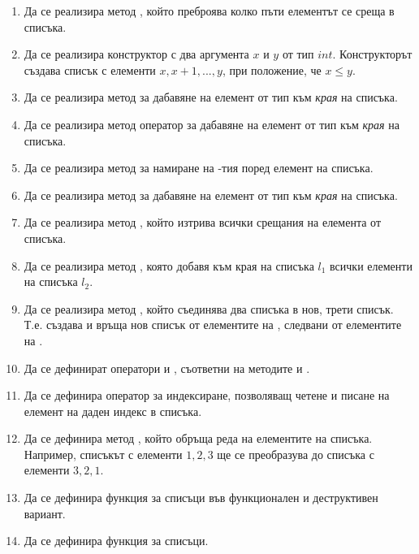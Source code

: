 \begin{enumerate}

  \item Да се реализира метод , който преброява колко пъти елементът  се среща в списъка.

  \item Да се реализира конструктор с два аргумента $x$ и $y$ от тип $int$. Конструкторът създава списък с елементи $x, x+1, ..., y$, при положение, че $x \leq y$.

  \item Да се реализира метод  за дабавяне на елемент от тип  към \textit{края} на списъка.

  \item Да се реализира метод оператор  за дабавяне на елемент от тип  към \textit{края} на списъка.

  \item Да се реализира метод  за намиране на -тия поред елемент на списъка.

  \item Да се реализира метод  за дабавяне на елемент от тип  към \textit{края} на списъка.

  \item Да се реализира метод , който изтрива всички срещания на елемента  от списъка.

  \item Да се реализира метод , която добавя към края на списъка $l_1$ всички елементи на списъка $l_2$.

  \item Да се реализира метод , който съединява два списъка в нов, трети списък. Т.е.  създава и връща нов списък от елементите на , следвани от елементите на .

  \item Да се дефинират оператори  и , съответни на методите  и .

  \item Да се дефинира оператор за индексиране, позволяващ четене и писане на елемент на даден индекс в списъка.

  \item Да се дефинира метод , който обръща реда на елементите на списъка. Например, списъкът с елементи $1,2,3$ ще се преобразува до списъка с елементи $3,2,1$.

  \item Да се дефинира функция  за списъци във функционален и деструктивен вариант.

  \item Да се дефинира функция  за списъци.

\end{enumerate}

